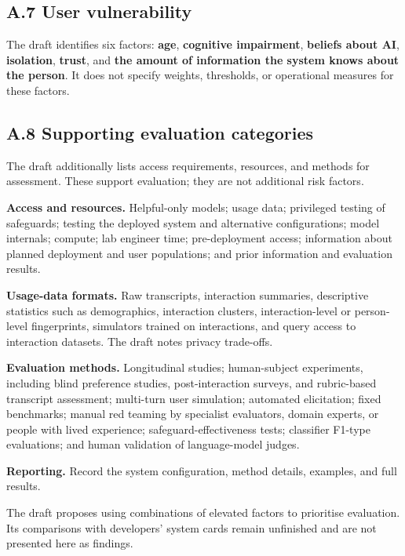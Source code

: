 \documentclass[
  english,
]{article}
\begin{document}
\subsection*{A.7 User vulnerability}\label{a.7-user-vulnerability}

The draft identifies six factors: \textbf{age}, \textbf{cognitive
impairment}, \textbf{beliefs about AI}, \textbf{isolation},
\textbf{trust}, and \textbf{the amount of information the system knows
about the person}. It does not specify weights, thresholds, or
operational measures for these factors.

\subsection*{A.8 Supporting evaluation
categories}\label{a.8-supporting-evaluation-categories}

The draft additionally lists access requirements, resources, and methods
for assessment. These support evaluation; they are not additional risk
factors.

\textbf{Access and resources.} Helpful-only models; usage data;
privileged testing of safeguards; testing the deployed system and
alternative configurations; model internals; compute; lab engineer time;
pre-deployment access; information about planned deployment and user
populations; and prior information and evaluation results.

\textbf{Usage-data formats.} Raw transcripts, interaction summaries,
descriptive statistics such as demographics, interaction clusters,
interaction-level or person-level fingerprints, simulators trained on
interactions, and query access to interaction datasets. The draft notes
privacy trade-offs.

\textbf{Evaluation methods.} Longitudinal studies; human-subject
experiments, including blind preference studies, post-interaction
surveys, and rubric-based transcript assessment; multi-turn user
simulation; automated elicitation; fixed benchmarks; manual red teaming
by specialist evaluators, domain experts, or people with lived
experience; safeguard-effectiveness tests; classifier F1-type
evaluations; and human validation of language-model judges.

\textbf{Reporting.} Record the system configuration, method details,
examples, and full results.

The draft proposes using combinations of elevated factors to prioritise
evaluation. Its comparisons with developers' system cards remain
unfinished and are not presented here as findings.
\end{document}
